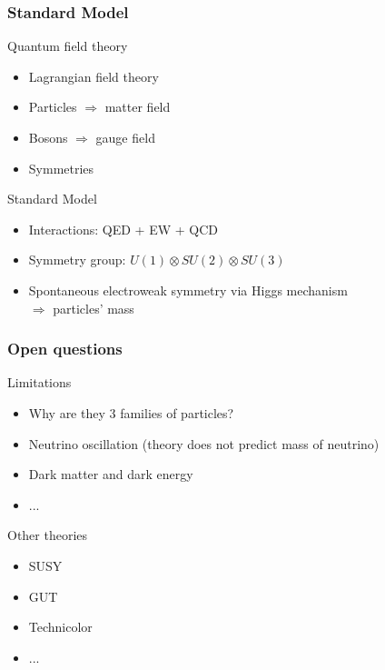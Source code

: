 \documentclass{beamer}
\begin{document}
    \begin{frame}
      \frametitle{Standard Model}

      \begin{block}{Quantum field theory}
        \begin{itemize}
          \item Lagrangian field theory
          \item Particles $\Rightarrow$ matter field
          \item Bosons $\Rightarrow$ gauge field
          \item Symmetries
        \end{itemize}
      \end{block}

      \begin{block}{Standard Model}
        \begin{itemize}
          \item Interactions: QED + EW + QCD
          \item Symmetry group: $U(1) \otimes SU(2) \otimes SU(3)$
          \item Spontaneous electroweak symmetry via Higgs mechanism \\ $\Rightarrow$ particles' mass
        \end{itemize}
      \end{block}
    \end{frame}

    \begin{frame}
      \frametitle{Open questions}

      \begin{alertblock}{Limitations}
        \begin{itemize}
          \item Why are they 3 families of particles?
          \item Neutrino oscillation (theory does not predict mass of neutrino)
          \item Dark matter and dark energy
          \item ...
        \end{itemize}
      \end{alertblock}
      
      \begin{block}{Other theories}
        \begin{itemize}
          \item SUSY
          \item GUT
          \item Technicolor
          \item ...
        \end{itemize}
      \end{block}
    \end{frame}
     
\end{document}
